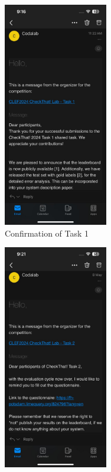 \documentclass{article}
\begin{document}
\begin{figure}[h!]
    \centering
    \begin{subfigure}[b]{0.45\textwidth}
        \centering
        \includegraphics[width=0.5\textwidth]{confirmationt1.jpg}
        \caption{Confirmation of Task 1}
        \label{fig:img1}
    \end{subfigure}
    \hfill
    \begin{subfigure}[b]{0.45\textwidth}
        \centering
        \includegraphics[width=0.5\textwidth]{confirmationt2.jpg}

\end{subfigure}
\end{figure}
\end{document}
